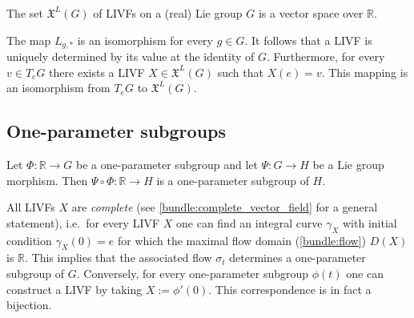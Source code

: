     \begin{property}
        The set $\mathfrak{X}^L(G)$ of LIVFs on a (real) Lie group $G$ is a vector space over $\mathbb{R}$.
    \end{property}
    \begin{property}\label{lie:livf_prop}
        The map $L_{g,\ast}$ is an isomorphism for every $g\in G$. It follows that a LIVF is uniquely determined by its value at the identity of $G$. Furthermore, for every $v\in T_eG$ there exists a LIVF $X\in\mathfrak{X}^L(G)$ such that $X(e)=v$. This mapping is an isomorphism from $T_eG$ to $\mathfrak{X}^L(G)$.
    \end{property}

\subsection{One-parameter subgroups}

    \begin{property}\label{lie:OPS_composition}
        Let $\Phi:\mathbb{R}\rightarrow G$ be a one-parameter subgroup and let $\Psi:G\rightarrow H$ be a Lie group morphism. Then $\Psi\circ\Phi:\mathbb{R}\rightarrow H$ is a one-parameter subgroup of $H$.
    \end{property}

    \begin{property}\label{lie:livf_subgroup}
        All LIVFs $X$ are \textit{complete} (see \cref{bundle:complete_vector_field} for a general statement), i.e.~for every LIVF $X$ one can find an integral curve $\gamma_X$ with initial condition $\gamma_X(0)=e$ for which the maximal flow domain (\cref{bundle:flow}) $D(X)$ is $\mathbb{R}$. This implies that the associated flow $\sigma_t$ determines a one-parameter subgroup of $G$. Conversely, for every one-parameter subgroup $\phi(t)$ one can construct a LIVF by taking $X:=\phi'(0)$. This correspondence is in fact a bijection.
    \end{property}

